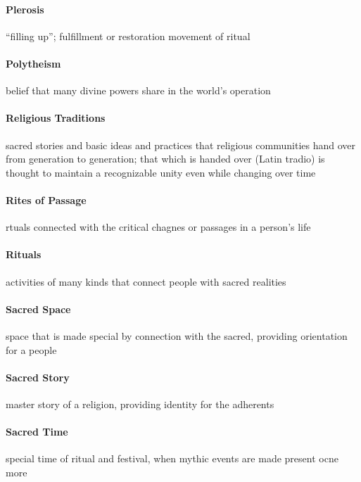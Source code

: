 \documentclass{article}
\begin{document}
\paragraph{Plerosis}
\label{par:plerosis}
``filling up''; fulfillment or restoration movement of ritual

\paragraph{Polytheism}
\label{par:polytheism}
belief that many divine powers share in the world's operation

\paragraph{Religious Traditions}
\label{par:religious_traditions}
sacred stories and basic ideas and practices that religious communities hand over from generation to generation; that which is handed over (Latin tradio) is thought to maintain a recognizable unity even while changing over time

\paragraph{Rites of Passage}
\label{par:rites_of_passage}
rtuals connected with the critical chagnes or passages in a person's life

\paragraph{Rituals}
\label{par:rituals}
activities of many kinds that connect people with sacred realities

\paragraph{Sacred Space}
\label{par:sacred_space}
space that is made special by connection with the sacred, providing orientation for a people

\paragraph{Sacred Story}
\label{par:sacred_story}
master story of a religion, providing identity for the adherents

\paragraph{Sacred Time}
\label{par:sacred_time}
special time of ritual and festival, when mythic events are made present ocne more
\end{document}
